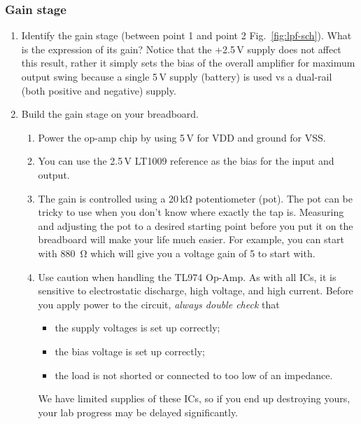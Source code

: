 \documentclass[letterpaper, 11pt]{article}
\begin{document}
\subsubsection{Gain stage}
\begin{enumerate}

	\item Identify the gain stage (between point 1 and point 2 Fig.~\ref{fig:lpf-sch}). What is the expression of its gain? Notice that the +2.5\,V supply does not affect this result, rather it simply sets the bias of the overall amplifier for maximum output swing because a single 5\,V supply (battery) is used vs a dual-rail (both positive and negative) supply.
	
	\item Build the gain stage on your breadboard. 
		\begin{enumerate}
			\item Power the op-amp chip by using 5\,V for VDD and ground for VSS. %
			
			\item You can use the 2.5\,V LT1009 reference as the bias for the input and output. 
			
			\item The gain is controlled using a 20\,k\si{\ohm} potentiometer (pot). The pot can be tricky to use when you don't know where exactly the tap is. Measuring and adjusting the pot to a desired starting point before you put it on the breadboard will make your life much easier. For example, you can start with \SI{880}{\ohm} which will give you a voltage gain of 5 to start with. 
			
			\item Use caution when handling the TL974 Op-Amp. As with all ICs, it is sensitive to electrostatic discharge, high voltage, and high current. Before you apply power to the circuit, \textit{always double check} that 
				\begin{itemize}
					\item the supply voltages is set up correctly;
					\item the bias voltage is set up correctly;
					\item the load is not shorted or connected to too low of an impedance.
				\end{itemize}
			We have limited supplies of these ICs, so if you end up destroying yours, your lab progress may be delayed significantly. 
		\end{enumerate}


\end{enumerate}
\end{document}
